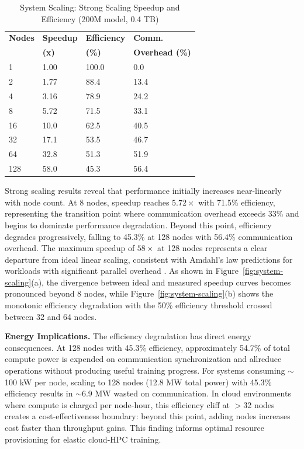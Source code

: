 \documentclass{llncs}
\begin{document}
\begin{table}[t]
\centering
\caption{System Scaling: Strong Scaling Speedup and Efficiency (200M model, 0.4 TB)}
\label{tab:system-scaling}
\begin{tabular*}{\columnwidth}{@{\extracolsep{\fill}} llll @{}}
\toprule
\textbf{Nodes} & \textbf{Speedup} & \textbf{Efficiency} & \textbf{Comm.} \\
 & \textbf{(x)} & \textbf{(\%)} & \textbf{Overhead (\%)} \\
\midrule
1 & 1.00 & 100.0 & 0.0 \\
2 & 1.77 & 88.4 & 13.4 \\
4 & 3.16 & 78.9 & 24.2 \\
8 & 5.72 & 71.5 & 33.1 \\
16 & 10.0 & 62.5 & 40.5 \\
32 & 17.1 & 53.5 & 46.7 \\
64 & 32.8 & 51.3 & 51.9 \\
128 & 58.0 & 45.3 & 56.4 \\
\bottomrule
\end{tabular*}
\end{table}

Strong scaling results reveal that performance initially increases near-linearly with node count. At 8 nodes, speedup reaches $5.72\times$ with 71.5\% efficiency, representing the transition point where communication overhead exceeds 33\% and begins to dominate performance degradation. Beyond this point, efficiency degrades progressively, falling to 45.3\% at 128 nodes with 56.4\% communication overhead. The maximum speedup of $58\times$ at 128 nodes represents a clear departure from ideal linear scaling, consistent with Amdahl's law predictions for workloads with significant parallel overhead \cite{Amdahl1967}. As shown in Figure~\ref{fig:system-scaling}(a), the divergence between ideal and measured speedup curves becomes pronounced beyond 8 nodes, while Figure~\ref{fig:system-scaling}(b) shows the monotonic efficiency degradation with the 50\% efficiency threshold crossed between 32 and 64 nodes.

\textbf{Energy Implications.} The efficiency degradation has direct energy consequences. At 128 nodes with 45.3\% efficiency, approximately 54.7\% of total compute power is expended on communication synchronization and allreduce operations without producing useful training progress. For systems consuming $\sim$100 kW per node, scaling to 128 nodes (12.8 MW total power) with 45.3\% efficiency results in $\sim$6.9 MW wasted on communication. In cloud environments where compute is charged per node-hour, this efficiency cliff at $>$32 nodes creates a cost-effectiveness boundary: beyond this point, adding nodes increases cost faster than throughput gains. This finding informs optimal resource provisioning for elastic cloud-HPC training.
\end{document}
